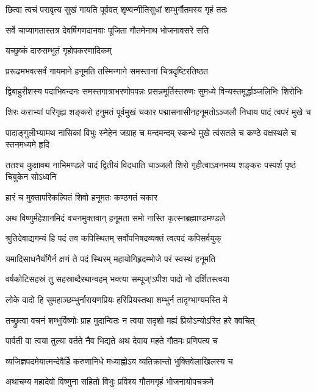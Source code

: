 \twolineshloka
{छित्वा त्वचं परावृत्य सुखं गायति पूर्ववत्}
{शृण्वन्गीतिसुधां शम्भुर्गौतमस्य गृहं ततः}%

\twolineshloka
{सर्वे चाप्यागतास्तत्र देवर्षिगणदानवाः}
{पूजिता गौतमेनाथ भोजनावसरे सति}%

\twolineshloka
{यच्छुष्कं दारुसम्भूतं गृहोपकरणादिकम्}

\twolineshloka
{प्ररूढमभवत्सर्वं गायमाने हनूमति}%
{तस्मिन्गाने समस्तानां चित्रदृष्टिरतिष्ठत}%

\twolineshloka
{द्विबाहुरीशस्य पदाभिवन्दनः समस्तगात्राभरणोपपन्नः}
{प्रसन्नमूर्तिस्तरुणः सुमध्ये विन्यस्तमूर्द्धाञ्जलिभिः शिरोभिः}%

\twolineshloka
{शिरः कराभ्यां परिगृह्य शङ्करो हनुमतं पूर्वमुखं चकार}
{पद्मासनासीनहनूमतोऽञ्जलौ निधाय पादं त्वपरं मुखे च}%

\twolineshloka
{पादाङ्गुलीभ्यामथ नासिकां विभुः स्नेहेन जग्राह च मन्दमन्दम्}
{स्कन्धे मुखे त्वंसतले च कण्ठे वक्षस्थले च स्तनमध्यमे हृदि}%

\twolineshloka
{ततश्च कुक्षावथ नाभिमण्डले पादं द्वितीयं विदधाति चाञ्जलौ}
{शिरो गृहीत्वाऽवनमय्य शङ्करः पस्पर्श पृष्ठं चिबुकेन सोऽध्वनि}%

\onelineshloka
{हारं च मुक्तापरिकल्पितं शिवो हनूमतः कण्ठगतं चकार}%

\twolineshloka
{अथ विष्णुर्महेशानमिदं वचनमुक्तवान्}
{हनूमता समो नास्ति कृत्स्नब्रह्माण्डमण्डले}%

\twolineshloka
{श्रुतिदेवाद्यगम्यं हि पदं तव कपिस्थितम्}
{सर्वोपनिषदव्यक्तं त्वत्पदं कपिसर्वयुक्}%

\twolineshloka
{यमादिसाधनैर्योगैर्न क्षणं ते पदं स्थिरम्}
{महायोगिहृदम्भोजे परं स्वस्थं हनूमति}%

\twolineshloka
{वर्षकोटिसहस्रं तु सहस्राब्दैरथान्वहम्}
{भक्त्या सम्पूज्!ऽपीश पादो नो दर्शितस्त्वया}%

\twolineshloka
{लोके वादो हि सुमहाञ्छम्भुर्नारायणप्रियः}
{हरिप्रियस्तथा शम्भुर्न तादृग्भाग्यमस्ति मे}%

\twolineshloka
{तच्छ्रुत्वा वचनं शम्भुर्विष्णोः प्राह मुदान्वितः}
{न त्वया सदृशो मह्यं प्रियोऽन्योऽस्ति हरे क्वचित्}%

\twolineshloka
{पार्वती वा त्वया तुल्या वर्तते नैव भिद्यते}
{अथ देवाय महते गौतमः प्रणिपत्य च}%

\twolineshloka
{व्यजिज्ञपदमेयात्मन्देवैर्हि करुणानिधे}
{मध्याह्नोऽय व्यतिक्रान्तो भुक्तिवेलाखिलस्य च}%

\twolineshloka
{अथाचम्य महादेवो विष्णुना सहितो विभुः}
{प्रविश्य गौतमगृहं भोजनायोपचक्रमे}%

